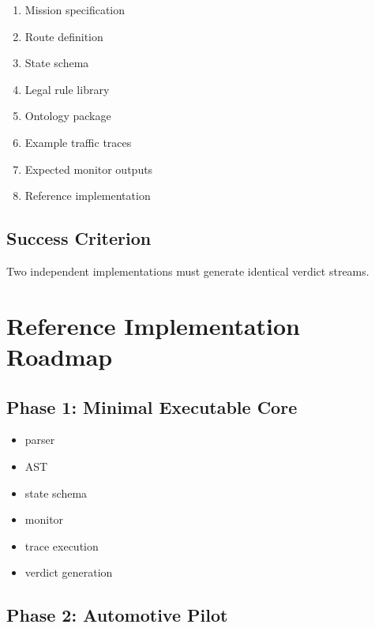 \documentclass[a4paper,11pt]{article}
\begin{document}
\begin{enumerate}

\item Mission specification

\item Route definition

\item State schema

\item Legal rule library

\item Ontology package

\item Example traffic traces

\item Expected monitor outputs

\item Reference implementation

\end{enumerate}

\subsection{Success Criterion}

Two independent implementations
must generate identical verdict streams.

\section{Reference Implementation Roadmap}

\subsection*{Phase 1: Minimal Executable Core}

\begin{itemize}
\item parser
\item AST
\item state schema
\item monitor
\item trace execution
\item verdict generation
\end{itemize}

\subsection*{Phase 2: Automotive Pilot}
\end{document}
